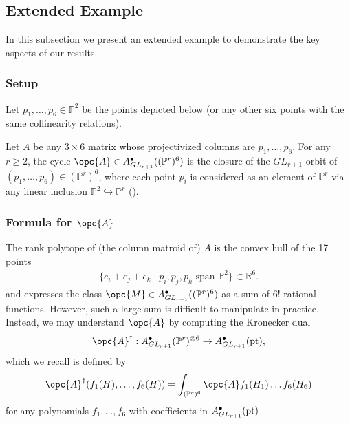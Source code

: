 \documentclass[12pt]{amsart}
\newcommand{\mb}{\mathbb}
\newcommand{\pt}{{\rm pt}}
\theoremstyle{plain}
\theoremstyle{definition}
\theoremstyle{remark}
\begin{document}
\subsection{Extended Example}
\label{extendedexample}
In this subsection we present an extended example to demonstrate the key aspects of our results. 
\subsubsection{Setup} Let $p_1,\ldots,p_{6}\in \mb{P}^2$ be the points depicted below (or any other six points with the same collinearity relations).

\begin{center}
\end{center}
Let $A$ be any $3 \times 6$ matrix whose projectivized columns are $p_1, \ldots, p_{6}$. For any $r \geq 2$, the cycle $\opc{A} \in A^\bullet_{GL_{r+1}}((\mb{P}^r)^{6})$ is the closure of the $GL_{r+1}$-orbit of $(p_1, \ldots, p_{6}) \in (\mb{P}^r)^{6}$, where each point $p_i$ is considered as an element of $\mb{P}^r$ via any linear inclusion $\mb{P}^2 \hookrightarrow \mb{P}^{r}$ ().

\subsubsection{Formula for $\opc{A}$}
The rank polytope of (the column matroid of) $A$ is the convex hull of the 17 points
\begin{align*}
\{e_i+e_j+e_k\mid p_i, p_j, p_k\text{ span }\mb{P}^2\} \subset \mb{R}^{6}.
\end{align*}
and  expresses the class $\opc{M}\in A^\bullet_{GL_{r+1}}((\mb{P}^r)^{6})$ as a sum of $6!$ rational functions. However, such a large sum is difficult to manipulate in practice. Instead, we may understand $\opc{A}$ by computing the Kronecker dual \[\opc{A}^{\dagger} : A^\bullet_{GL_{r+1}}(\mb{P}^r)^{\otimes 6} \to A^\bullet_{GL_{r+1}}(\pt),\] which we recall is defined by \[\opc{A}^\dagger(f_1(H), \ldots, f_6(H)) = \int_{(\mb{P}^r)^{6}} \opc{A} f_1(H_1) \ldots f_6(H_6)\] for any polynomials $f_1, \ldots, f_{6}$ with coefficients in $A^\bullet_{GL_{r+1}}(\pt)$.
\end{document}
